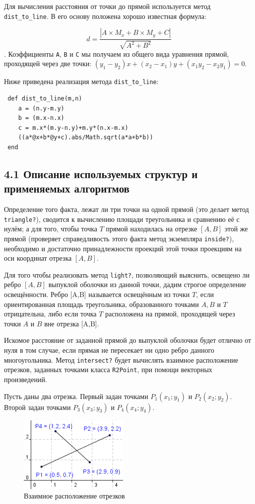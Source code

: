 Для вычисления расстояния от точки до прямой используется метод \verb|dist_to_line|.
 В его основу положена хорошо известная формула:

 $$d = \frac{|A\times M_x+B\times M_y+C|}{\sqrt{A^2+B^2}}$$. Коэффициенты  \verb|A|, \verb|B| и \verb|C|
 мы получаем из общего вида уравнения прямой, проходящей через две точки:
   $ \left(y_1-y_2\right)x+\left(x_2-x_1\right)y+\left(x_1y_2-x_2y_1\right)=0. $

Ниже приведена реализация метода \verb|dist_to_line|:

\begin{lstlisting}
 def dist_to_line(m,n)
    a = (n.y-m.y)
    b = (m.x-n.x)
    c = m.x*(m.y-n.y)+m.y*(n.x-m.x)
    ((a*@x+b*@y+c).abs/Math.sqrt(a*a+b*b))
 end
\end{lstlisting}


\subsection*{4.1 Описание используемых структур и применяемых алгоритмов}

Определение того факта, лежат ли три точки на одной прямой (это делает
метод \verb|triangle?|), сводится к вычислению площади треугольника
и сравнению её с нулём; а для того, чтобы точка $T$ прямой находилась на отрезке
$[A,B]$ этой же прямой (проверяет справедливость этого факта
метод экземпляра \verb|inside?|), необходимо и достаточно принадлежности
проекций этой точки проекциям на оси координат отрезка $[A,B]$.

Для того чтобы реализовать метод \verb|light?|, позволяющий выяснить,
освещено ли ребро $[A,B]$ выпуклой оболочки из данной точки, дадим строгое определение освещённости.
Ребро [A,B] называется освещённым из точки $T$, если ориентированная
площадь треугольника, образованного точками $A, B$ и $T$ отрицательна, либо если
точка $T$ расположена на прямой, проходящей через точки $A$ и $B$ вне отрезка [A,B].

Искомое расстояние от заданной прямой до выпуклой оболочки будет отлично от нуля
в том случае, если прямая не пересекает ни одно ребро данного многоугольника.
Метод \verb|intersect?| будет вычислять взаимное расположение
отрезков, заданных точками класса \verb|R2Point|, при помощи векторных произведений.

Пусть даны два отрезка. Первый задан точками $P_1(x_1;y_1)$ и $P_2(x_2;y_2)$.
 Второй задан точками $P_3(x_3;y_3)$ и  $P_4(x_4;y_4)$.

\begin{figure}[ht!]
\begin{center}
\includegraphics[width=0.4\hsize]{images/conv_4}
\end{center}
\caption{Взаимное расположение отрезков}\label{fig:conv_4}
\end{figure}

